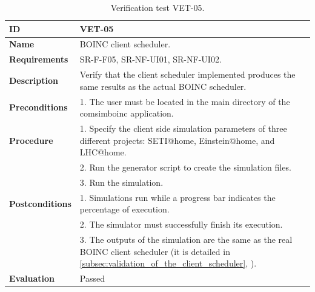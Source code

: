 \begin{center}
\begin{table}[htb]
\centering
\begin{tabular}{@{}p{2.5cm} p{13cm}@{}} 
\toprule
\textbf{ID} 					& VET-05 \\
\midrule
\textbf{Name} 				& BOINC client scheduler. \\
\midrule
\textbf{Requirements} 		& SR-F-F05, SR-NF-UI01, SR-NF-UI02. \\
\midrule
\textbf{Description} 		& Verify that the client scheduler implemented produces the same results as the actual BOINC scheduler. \\
\midrule
\textbf{Preconditions}		& 1. The user must be located in the main directory of the \gls{comsimboinc} application. \\
\midrule
\textbf{Procedure}			& 1. Specify the client side simulation parameters of three different projects: SETI@home, Einstein@home, and LHC@home. \\
							& 2. Run the generator script to create the simulation files.\\
							& 3. Run the simulation.\\
\midrule
\textbf{Postconditions} 		& 1. Simulations run while a progress bar indicates the percentage of execution. \\
							& 2. The simulator must successfully finish its execution. \\
							& 3. The outputs of the simulation are the same as the real BOINC client scheduler (it is detailed in \ref{subsec:validation_of_the_client_scheduler}, \textit{\nameref{subsec:validation_of_the_client_scheduler}}).  \\
\midrule
\textbf{Evaluation} 			& Passed \\
\bottomrule
\end{tabular}
\caption{Verification test VET-05.}
\label{tab:vet05}
\end{table}
\end{center}


